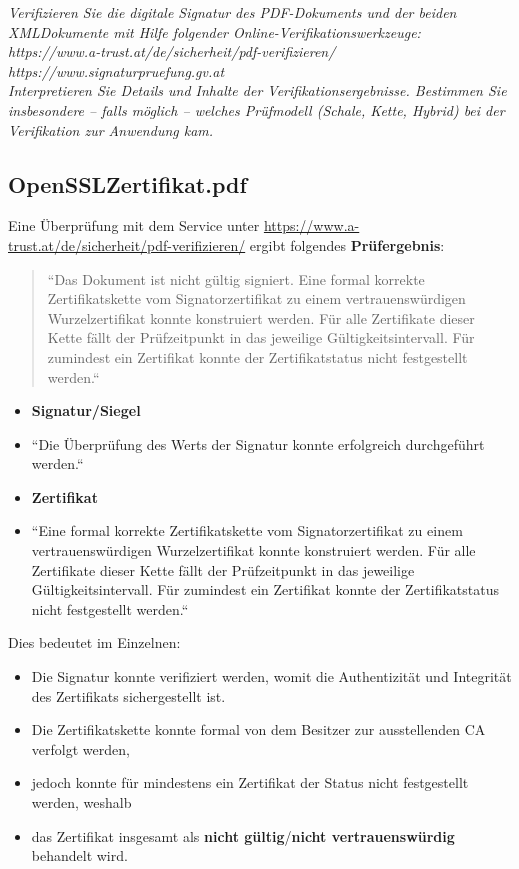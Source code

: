\textit{Verifizieren Sie die digitale Signatur des PDF-Dokuments und der beiden XMLDokumente mit Hilfe folgender Online-Verifikationswerkzeuge:\\
https://www.a-trust.at/de/sicherheit/pdf-verifizieren/\\
https://www.signaturpruefung.gv.at\\
Interpretieren Sie Details und Inhalte der Verifikationsergebnisse. Bestimmen Sie
insbesondere – falls möglich – welches Prüfmodell (Schale, Kette, Hybrid) bei der
Verifikation zur Anwendung kam.}

\subsection*{OpenSSLZertifikat.pdf}

Eine Überprüfung mit dem Service unter \url{https://www.a-trust.at/de/sicherheit/pdf-verifizieren/} ergibt folgendes \textbf{Prüfergebnis}:

\blockquote[]{
``Das Dokument ist nicht gültig signiert. Eine formal korrekte Zertifikatskette vom Signatorzertifikat zu einem vertrauenswürdigen Wurzelzertifikat konnte konstruiert werden. Für alle Zertifikate dieser Kette fällt der Prüfzeitpunkt in das jeweilige Gültigkeitsintervall. Für zumindest ein Zertifikat konnte der Zertifikatstatus nicht festgestellt werden.``
}

\begin{itemize}
    \itemsep0.5em
    \item \textbf{Signatur/Siegel}
    \item[] ``Die Überprüfung des Werts der Signatur konnte erfolgreich durchgeführt werden.``
    \item \textbf{Zertifikat}
    \item[] ``Eine formal korrekte Zertifikatskette vom Signatorzertifikat zu einem vertrauenswürdigen Wurzelzertifikat konnte konstruiert werden. Für alle Zertifikate dieser Kette fällt der Prüfzeitpunkt in das jeweilige Gültigkeitsintervall. Für zumindest ein Zertifikat konnte der Zertifikatstatus nicht festgestellt werden.``
\end{itemize}

\noindent
Dies bedeutet im Einzelnen:

\begin{itemize}
    \itemsep0.5em
    \item Die Signatur konnte verifiziert werden, womit die Authentizität und Integrität des Zertifikats sichergestellt ist.
    \item Die Zertifikatskette konnte formal von dem Besitzer zur ausstellenden CA verfolgt werden,
    \item jedoch konnte für mindestens ein Zertifikat der Status nicht festgestellt werden, weshalb
    \item das Zertifikat insgesamt als \textbf{nicht gültig}/\textbf{nicht vertrauenswürdig} behandelt wird.
\end{itemize}

